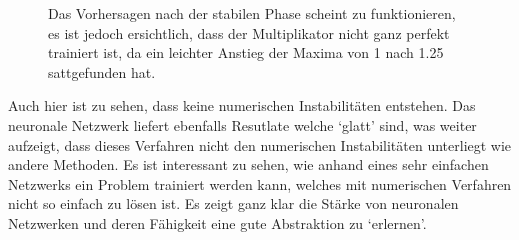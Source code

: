 \begin{figure}
\begin{tabular}{ccc}
	\end{tabular}
	\label{fig:mst_burgers_predict_2}
	\caption{Das Vorhersagen nach der stabilen Phase scheint zu funktionieren, es ist jedoch ersichtlich, dass der Multiplikator nicht ganz perfekt trainiert ist, da ein leichter Anstieg der Maxima von 1 nach 1.25 sattgefunden hat.}
\end{figure}

Auch hier ist zu sehen, dass keine numerischen Instabilitäten entstehen. Das neuronale Netzwerk liefert ebenfalls Resutlate welche `glatt' sind, was weiter aufzeigt, dass dieses Verfahren nicht den numerischen Instabilitäten unterliegt wie andere Methoden. Es ist interessant zu sehen, wie anhand eines sehr einfachen Netzwerks ein Problem trainiert werden kann, welches mit numerischen Verfahren nicht so einfach zu lösen ist. Es zeigt ganz klar die Stärke von neuronalen Netzwerken und deren Fähigkeit eine gute Abstraktion zu `erlernen'.